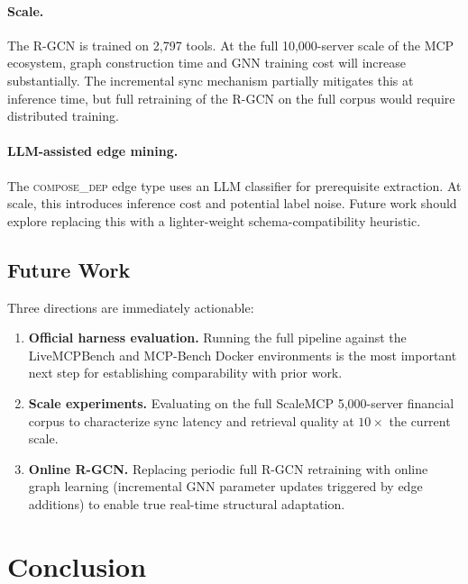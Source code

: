 \documentclass[conference]{IEEEtran}
\begin{document}
\paragraph{Scale.}
The R-GCN is trained on 2,797 tools. At the full 10,000-server scale
of the MCP ecosystem, graph construction time and GNN training cost
will increase substantially. The incremental sync mechanism partially
mitigates this at inference time, but full retraining of the R-GCN on
the full corpus would require distributed training.

\paragraph{LLM-assisted edge mining.}
The \textsc{compose\_dep} edge type uses an LLM classifier for
prerequisite extraction. At scale, this introduces inference cost and
potential label noise. Future work should explore replacing this with
a lighter-weight schema-compatibility heuristic.

\subsection{Future Work}

Three directions are immediately actionable:

\begin{enumerate}
    \item \textbf{Official harness evaluation.} Running the full
    pipeline against the LiveMCPBench and MCP-Bench Docker
    environments is the most important next step for establishing
    comparability with prior work.

    \item \textbf{Scale experiments.} Evaluating on the full
    ScaleMCP 5,000-server financial corpus to characterize sync
    latency and retrieval quality at $10\times$ the current scale.

    \item \textbf{Online R-GCN.} Replacing periodic full R-GCN
    retraining with online graph learning (incremental GNN parameter
    updates triggered by edge additions) to enable true real-time
    structural adaptation.
\end{enumerate}


\section{Conclusion}
\end{document}
